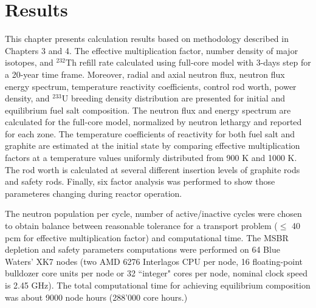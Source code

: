 \chapter[Results]{Results}

This chapter presents calculation results based on methodology described in Chapters 3 and 4. The effective multiplication factor, number density of major isotopes, and $^{232}$Th refill rate calculated using full-core model with 3-days step for a 20-year time frame. Moreover, radial and axial neutron flux, neutron flux energy spectrum, temperature reactivity coefficients, control rod worth, power density, and $^{233}$U breeding density distribution are presented for initial and equilibrium fuel salt composition. The neutron flux and energy spectrum are calculated for the full-core model, normalized by neutron lethargy and reported for each zone. The temperature coefficients of reactivity for both fuel salt and graphite are estimated at the initial state by comparing effective multiplication factors at a temperature values uniformly distributed from 900 K and 1000 K. The rod worth is calculated at several different insertion levels of graphite rods and safety rods. Finally, six factor analysis was performed to show those parameteres changing during reactor operation.

The neutron population per cycle, number of active/inactive cycles were chosen to obtain balance between reasonable tolerance for a transport problem ($\leq$ 40 pcm for effective multiplication factor) and computational time. The \gls{MSBR} depletion and safety parameters computations were performed on 64 Blue Waters' XK7 nodes (two AMD 6276 Interlagos CPU per node, 16 floating-point bulldozer core units per node or 32 ``integer" cores per node, nominal clock speed is 2.45 GHz). The total computational time for achieving equilibrium composition was about 9000 node hours (288'000 core hours.)

